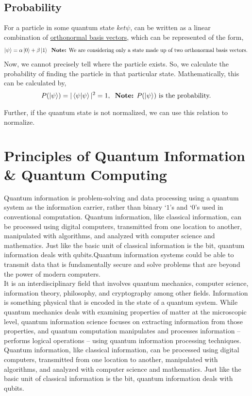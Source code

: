 \documentclass{article}
\begin{document}
\subsection{Probability}
\label{subsec:Probability}
For a particle in some quantum state $ket{\psi}$, can be written as a linear combination of \underline{orthonormal basis vectors}, which can be represented of the form,
\begin{equation*}
    \ket{\psi} = \alpha\ket{0} + \beta\ket{1} \hspace{0.2cm}\text{\textbf{Note:} We are considering only a state made up of two orthonormal basis vectors.}
\end{equation*}
Now, we cannot precisely tell where the particle exists. So, we calculate the probability of finding the particle in that particular state. Mathematically, this can be calculated by,
\begin{equation}
    P(\ket{\psi}) = |\braket{\psi}{\psi}|^{2} = 1, 
    \hspace{0.2cm}
    \text{\textbf{Note:} $P(\ket{\psi})$ is the probability.}
\end{equation}

Further, if the quantum state is not normalized, we can use this relation to normalize. 

\newpage
\section{Principles of Quantum Information \& Quantum Computing}
\label{sec: Principles of Quantum Information}

Quantum information is problem-solving and data processing using a quantum system as the information carrier, rather than binary $‘1’$s and $‘0’$s used in conventional computation. Quantum information, like classical information, can be processed using digital computers, transmitted from one location to another, manipulated with algorithms, and analyzed with computer science and mathematics. Just like the basic unit of classical information is the bit, quantum information deals with qubits.Quantum information systems could be able to transmit data that is fundamentally secure and solve problems that are beyond the power of modern computers.\\
It is an interdisciplinary field that involves quantum mechanics, computer science, information theory, philosophy, and cryptography among other fields.
Information is something physical that is encoded in the state of a quantum system. While quantum mechanics deals with examining properties of matter at the microscopic level, quantum information science focuses on extracting information from those properties, and quantum computation manipulates and processes information – performs logical operations – using quantum information processing techniques.\\
Quantum information, like classical information, can be processed using digital computers, transmitted from one location to another, manipulated with algorithms, and analyzed with computer science and mathematics. Just like the basic unit of classical information is the bit, quantum information deals with qubits.
\end{document}
